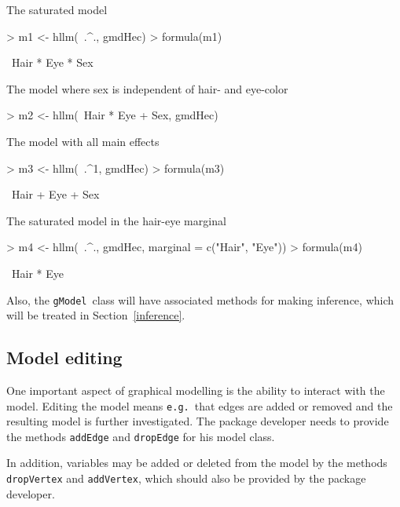 \documentclass{article}
\def\code#1{\texttt{#1}}
\def\textit#1{\texttt{#1}}
\newcommand{\eg}{\textit{e.g.}}
\def\gModel             {\code{gModel}} %
\begin{document}
\footnotesize 
\normalsize
The saturated model
\footnotesize 
\begin{Schunk}
\begin{Sinput}
> m1 <- hllm(~.^., gmdHec)
> formula(m1)
\end{Sinput}
\begin{Soutput}
~Hair * Eye * Sex
\end{Soutput}
\end{Schunk}
\normalsize
The model where sex is independent of hair- and eye-color
\footnotesize 
\begin{Schunk}
\begin{Sinput}
> m2 <- hllm(~Hair * Eye + Sex, gmdHec)
\end{Sinput}
\end{Schunk}
\normalsize
The model with all main effects
\footnotesize 
\begin{Schunk}
\begin{Sinput}
> m3 <- hllm(~.^1, gmdHec)
> formula(m3)
\end{Sinput}
\begin{Soutput}
~Hair + Eye + Sex
\end{Soutput}
\end{Schunk}
\normalsize
The saturated model in the hair-eye marginal
\footnotesize 
\begin{Schunk}
\begin{Sinput}
> m4 <- hllm(~.^., gmdHec, marginal = c("Hair", "Eye"))
> formula(m4)
\end{Sinput}
\begin{Soutput}
~Hair * Eye
\end{Soutput}
\end{Schunk}
\normalsize

Also, the \gModel\ class will have associated methods for making
inference, which will be treated in Section~\ref{inference}.

\subsection{Model editing}
\label{sec:model-select-model}

One important aspect of graphical modelling is the ability to interact
with the model. Editing the model means \eg\ that edges are added or
removed and the resulting model is further investigated.  The package
developer needs to provide the methods \code{addEdge} and
\code{dropEdge} for his model class.


In addition, variables may be added or deleted from the model
by the methods \code{dropVertex}
and \code{addVertex}, which should also be provided by the package
developer.
\end{document}

